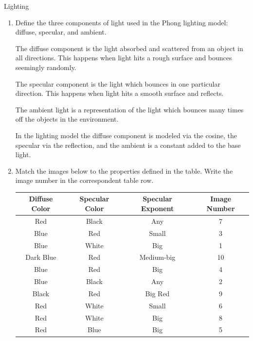 \documentclass{article}
\begin{document}
    {\large Lighting}
    \begin{enumerate}
        \item Define the three components of light used in the Phong lighting model: diffuse,
            specular, and ambient.
            \begin{mdframed}
               The diffuse component is the light absorbed and scattered from an object
               in all directions. This happens when light hits a rough surface and bounces seemingly
               randomly.

               The specular component is the light which bounces in one particular direction.
               This happens when light hits a smooth surface and reflects.

               The ambient light is a representation of the light which bounces many times
               off the objects in the environment.

               In the lighting model the diffuse component is modeled via
               the cosine, the specular via the reflection, and the ambient
               is a constant added to the base light.
            \end{mdframed}

            \break
        \item Match the images below to the properties defined in the table. Write the image
            number in the correspondent table row.

            \begin{tabular}{|c|c|c|c|}
                \hline
                Diffuse Color & Specular Color & Specular Exponent & Image Number\\
                \hline
                Red & Black & Any & 7\\
                \hline
                Blue & Red & Small & 3\\
                \hline
                Blue & White & Big & 1\\
                \hline
                Dark Blue & Red & Medium-big & 10\\
                \hline
                Blue & Red & Big & 4\\
                \hline
                Blue & Black & Any & 2\\
                \hline
                Black & Red & Big Red & 9\\
                \hline
                Red & White & Small & 6\\
                \hline
                Red & White & Big & 8\\
                \hline
                Red & Blue & Big & 5\\
                \hline
            \end{tabular}


\end{enumerate}
\end{document}
